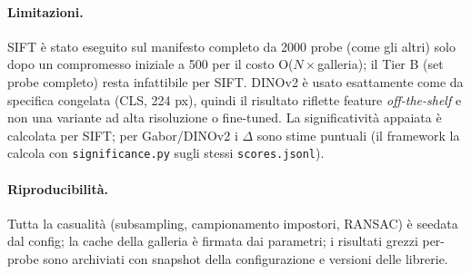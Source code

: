 \documentclass[11pt,a4paper]{article}
\begin{document}
\paragraph{Limitazioni.} SIFT \`e stato eseguito sul manifesto completo da
\num{2000} probe (come gli altri) solo dopo un compromesso iniziale a \num{500}
per il costo O(\(N\times\)galleria); il Tier B (set probe completo) resta
infattibile per SIFT. DINOv2 \`e usato esattamente come da specifica congelata
(CLS, 224 px), quindi il risultato riflette feature \emph{off-the-shelf} e non una
variante ad alta risoluzione o fine-tuned. La significativit\`a appaiata \`e
calcolata per SIFT; per Gabor/DINOv2 i \(\Delta\) sono stime puntuali (il
framework la calcola con \texttt{significance.py} sugli stessi \texttt{scores.jsonl}).

\paragraph{Riproducibilit\`a.} Tutta la casualit\`a (subsampling, campionamento
impostori, RANSAC) \`e seedata dal config; la cache della galleria \`e firmata dai
parametri; i risultati grezzi per-probe sono archiviati con snapshot della
configurazione e versioni delle librerie.
\end{document}
